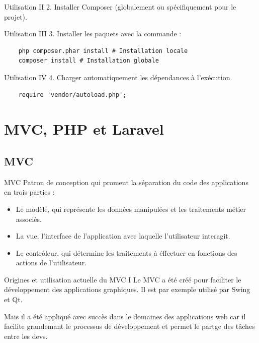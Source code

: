 \documentclass{beamer}
\begin{document}
\begin{frame}{Utilisation II}
  2. Installer Composer (globalement ou spécifiquement pour le projet).
\end{frame}

\begin{frame}[fragile]{Utilisation III}
  3. Installer les paquets avec la commande :
  \begin{Verbatim}
    php composer.phar install # Installation locale
    composer install # Installation globale
  \end{Verbatim}
\end{frame}

\begin{frame}[fragile]{Utilisation IV}
  4. Charger automatiquement les dépendances à l'exécution.
  \begin{verbatim}
    require 'vendor/autoload.php';
  \end{verbatim}
\end{frame}

\section{MVC, PHP et Laravel}

\subsection{MVC}
\begin{frame}{MVC}
Patron de conception qui promeut la séparation du code des applications en trois parties :
\begin{itemize}
  \item Le modèle, qui représente les données manipulées et les traitements métier associés.
  \item La vue, l'interface de l'application avec laquelle l'utilisateur interagit.
  \item Le contrôleur, qui détermine les traitements à éffectuer en fonctions des actions de l'utilisateur.
\end{itemize}
\end{frame}

\begin{frame}{Origines et utilisation actuelle du MVC I}
Le MVC a été créé pour faciliter le développement des applications graphiques. Il est par exemple utilisé par Swing et Qt.

Mais il a été appliqué avec succès dans le domaines des applications web car il facilite grandemant le processus de développement et permet le partge des tâches entre les devs.
\end{frame}
\end{document}
